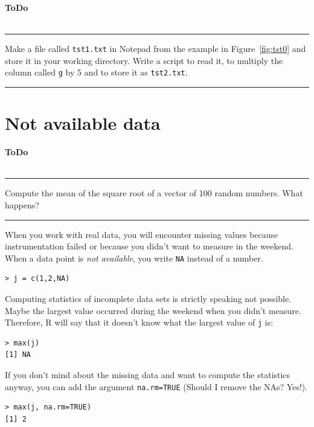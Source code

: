 \documentclass[a4paper,11pt,twocolumn,tablecaptionabove]{scrartcl}
\newenvironment{ToDo} {%
  \begin{flushright}
    \hfill
    \begin{minipage}{0.95\columnwidth}         %
    \textsf{\textbf{ToDo}} \\
      \vspace{-0.85cm}\\
      {\color{Gray}\rule[-0.1cm]{\columnwidth}{1.5pt}}} { %
      {\color{Gray} \rule[0.3cm]{\columnwidth}{1.5pt}}
    \end{minipage}
    \vspace{1em}
  \end{flushright}
  }
\begin{document}
\begin{ToDo}
  Make a file called \texttt{tst1.txt} in Notepad from the example in Figure~\ref{fig:tst0} and store it in your working directory. Write a
  script to read it, to multiply the column called \texttt{g} by 5 and to store it as
  \texttt{tst2.txt}.\\
\end{ToDo}


\section{Not available data}

\begin{ToDo}
Compute the mean of the square root of a vector of 100 random numbers. What happens? 
\end{ToDo}

When you work with real data, you will encounter missing values because instrumentation failed or because you didn't want to measure in the weekend. When a data point is \emph{not available}, you write \texttt{NA} instead of a number. 

\begin{Verbatim}[frame=single,gobble=0]
> j = c(1,2,NA)
\end{Verbatim}

Computing statistics of incomplete data sets is strictly speaking not possible. Maybe the largest value occurred during the weekend when you didn't measure. Therefore, R will say that it doesn't know what the largest value of \texttt{j} is: 

\begin{Verbatim}[frame=single,gobble=0]
> max(j)
[1] NA
\end{Verbatim}

If you don't mind about the missing data and want to compute the statistics anyway, you can add the argument \texttt{na.rm=TRUE} (Should I remove the NAs? Yes!). 

\begin{Verbatim}[frame=single,gobble=0]
> max(j, na.rm=TRUE)
[1] 2
\end{Verbatim}


\end{document}
